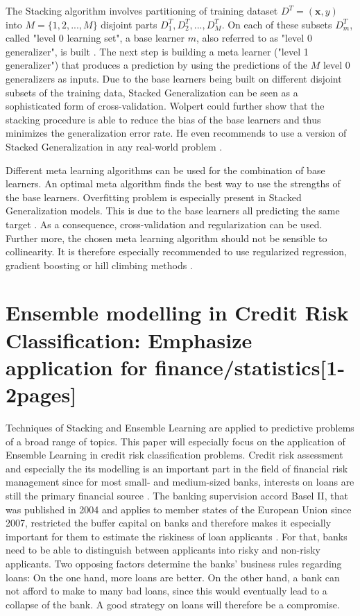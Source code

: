 \documentclass[12pt]{article}
\begin{document}
The Stacking algorithm involves partitioning of training dataset $D^T = (\mathbf{x}, y)$ into $M = \{1, 2,..., M\}$ disjoint parts $D^T_1, D^T_2,..., D^T_M$. On each of these subsets $D^T_m$, called "level 0 learning set", a base learner $m$, also referred to as "level 0 generalizer", is built \citep[p.57]{wolpert1992stacked}. The next step is building a meta learner ("level 1 generalizer") that produces a prediction by using the predictions of the $M$ level 0 generalizers as inputs. Due to the base learners being built on different disjoint subsets of the training data, Stacked Generalization can be seen as a sophisticated form of cross-validation. Wolpert could further show that the stacking procedure is able to reduce the bias of the base learners and thus minimizes the generalization error rate. He even recommends to use a version of Stacked Generalization in any real-world problem \citep[p.2]{wolpert1992stacked}. 

Different meta learning algorithms can be used for the combination of base learners. An optimal meta algorithm finds the best way to use the strengths of the base learners. Overfitting problem is especially present in Stacked Generalization models. This is due to the base learners all predicting the same target \citep{online2017stacking}. As a consequence, cross-validation and regularization can be used. Further more, the chosen meta learning algorithm should not be sensible to collinearity. It is therefore especially recommended to use regularized regression, gradient boosting or hill climbing methods \citep{SASpaper}. 






\section{Ensemble modelling in Credit Risk Classification: Emphasize application for finance/statistics[1-2pages]}
Techniques of Stacking and Ensemble Learning are applied to predictive problems of a broad range of topics. This paper will especially focus on the application of Ensemble Learning in credit risk classification problems. Credit risk assessment and especially the its modelling is an important part in the field of financial risk management since for most small- and medium-sized banks, interests on loans are still the primary financial source \citep[p.2]{jacobson2006internal}. The banking supervision accord Basel II, that was published in 2004 and applies to member states of the European Union since 2007, restricted the buffer capital on banks and therefore makes it especially important for them to estimate the riskiness of loan applicants \citep{basel2}. For that, banks need to be able to distinguish between applicants into risky and non-risky applicants. Two opposing factors determine the banks' business rules regarding loans: On the one hand, more loans are better. On the other hand, a bank can not afford to make to many bad loans, since this would eventually lead to a collapse of the bank. A good strategy on loans will therefore be a compromise. 
\end{document}
